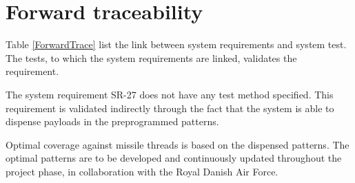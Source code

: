\documentclass[Main]{subfiles}
\begin{document}
\chapter{Forward traceability}
Table \ref{ForwardTrace} list the link between system requirements and system test. 
The tests, to which the system requirements are linked, validates the requirement. 

The system requirement SR-27 does not have any test method specified. 
This requirement is validated indirectly through the fact that the system is able to dispense payloads in the preprogrammed patterns.

Optimal coverage against missile threads is based on the dispensed patterns. 
The optimal patterns are to be developed and continuously updated throughout the project phase, in collaboration with the Royal Danish Air Force.\\
\end{document}

